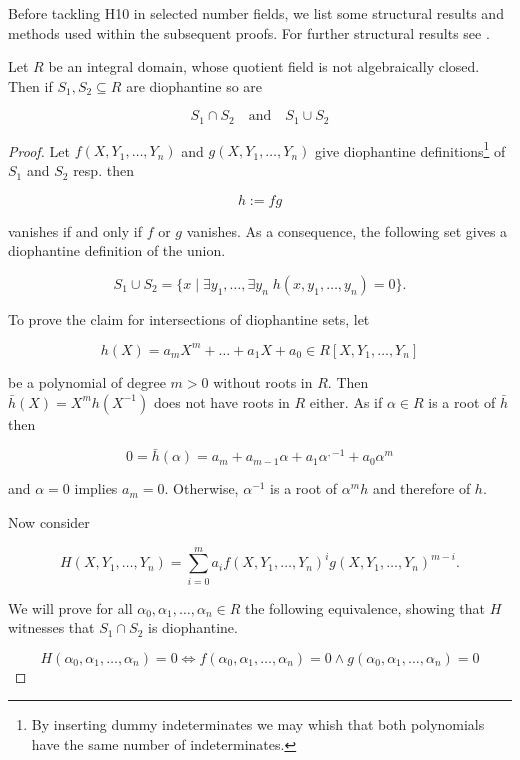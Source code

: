 
Before tackling \textsc{H10} in selected number fields, we list some
structural results and methods used within the subsequent proofs. For
further structural results see \cite{Shlapentokh2000}.

\begin{lem}\label{lem:intersections and unions}
    Let $R$ be an integral domain, whose quotient field is not
    algebraically closed. Then if $S_1, S_2 \subseteq R$ are diophantine so are

    \[ S_1 ∩ S_2 \quad \text{and} \quad S_1 ∪ S_2 \]
\end{lem}

\begin{proof}
Let $f(X, Y_1, …, Y_n)$ and $g(X, Y_1, …, Y_n)$ give diophantine
definitions\footnote{By inserting dummy indeterminates we may whish that
both polynomials have the same number of indeterminates.} of $S_1$
and $S_2$ resp. then

\[ h := fg \]

vanishes if and only if $f$ or $g$ vanishes. As a consequence, the
following set gives a diophantine definition of the union.

\[ S_1 ∪ S_2 = \lbrace x \mid ∃ y_1, … , ∃ y_n \; h(x, y_1, … , y_n) = 0 \rbrace. \]

To prove the claim for intersections of diophantine sets, let

\[h(X) = a_m X^m + … + a_1 X + a_0 ∈ R[X, Y_1, …, Y_n]\]

be a polynomial of degree $m > 0$ without roots in $R$. Then
$\bar h(X) = X^m h(X^{-1})$ does not have roots in $R$ either. As if
$α ∈ R$ is a root of $\bar h$ then

\[ 0 = \bar h(α) = a_m + a_{m-1} α + a_1 α^{,-1} + a_0 α^m\]

and $α = 0$ implies $a_m = 0$. Otherwise, $α^{-1}$ is a root of
$α^m h$ and therefore of $h$.

Now consider

\[ H(X, Y_1, …, Y_n) = \sum_{i=0}^m a_i f(X, Y_1, …, Y_n)^i g(X, Y_1, …, Y_n)^{m - i}.\]

We will prove for all $α_0, α_1, …, α_n ∈ R$ the following
equivalence, showing that $H$ witnesses that $S_1 ∩ S_2$ is
diophantine.

\[ H(α_0, α_1, …, α_n) = 0 \Leftrightarrow f(α_0, α_1, …, α_n) = 0 ∧ g(α_0, α_1, …, α_n) = 0 \]


\end{proof}
